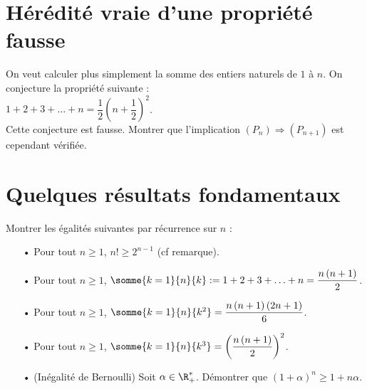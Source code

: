 \section{Hérédité vraie d'une propriété fausse}

On veut calculer plus simplement la somme des entiers naturels de $1$ à $n$. On conjecture la propriété suivante : \\

$1 + 2 + 3 + \ldots + n = \dfrac{1}{2}\left(n + \dfrac{1}{2}\right)^2$. \\

Cette conjecture est fausse. Montrer que l'implication $\left(P_n\right) \Longrightarrow \left(P_{n+1}\right)$ est cependant vérifiée. 

\vspace*{-50cm}

\newpage

\section{Quelques résultats fondamentaux}

Montrer les égalités suivantes par récurrence sur $n$ : \\

\begin{itemize}
\item[•] Pour tout $n \geqslant 1$, $n! \geqslant 2^{n-1}$ (cf remarque). \\

\item[•] Pour tout $n \geqslant 1$, $\somme{k=1}{n}{k} := 1 + 2 + 3 + \ldots + n = \dfrac{n\left(n+1\right)}{2}$. \\

\item[•] Pour tout $n \geqslant 1$, $\somme{k=1}{n}{k^2} = \dfrac{n\left(n+1\right)\left(2n+1\right)}{6}$. \\

\item[•] Pour tout $n \geqslant 1$, $\somme{k=1}{n}{k^3} = \left(\dfrac{n\left(n+1\right)}{2}\right)^2$. \\

\item[•] (Inégalité de Bernoulli) Soit $\alpha \in \R_+^*$. Démontrer que $\left(1+\alpha\right)^n \geqslant 1 + n\alpha$.
\end{itemize}







